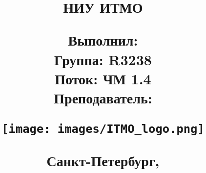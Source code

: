 \begin{titlepage}

\thispagestyle{empty}

\title{

НИУ ИТМО 
\vspace{2em}

\begin{center}
\LARGE{\textbf{\name}}

\subname

\end{center}

\vfill

\begin{flushright}
\large{ 
Выполнил: \textbf{\madeby} \\
Группа: \textbf{R3238} \\
Поток:  \textbf{ЧМ 1.4} \\
Преподаватель: \textbf{\teacher} 
}
\end{flushright}	

\vfill

\texttt{[image: images/ITMO\_logo.png]} 

\begin{center}
\normalsize{Санкт-Петербург, \the\year}
\end{center}
}

\date{}
\maketitle
\thispagestyle{empty}
\end{titlepage}